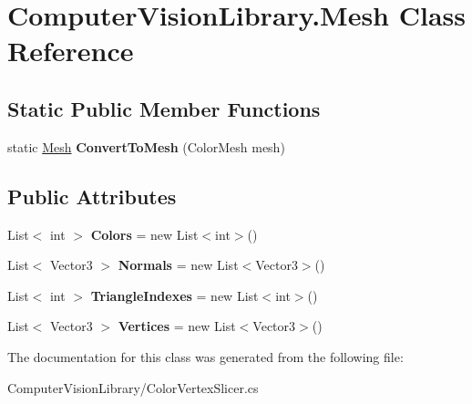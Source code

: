 \hypertarget{class_computer_vision_library_1_1_mesh}{}\section{Computer\+Vision\+Library.\+Mesh Class Reference}
\label{class_computer_vision_library_1_1_mesh}
\subsection*{Static Public Member Functions}
\begin{DoxyCompactItemize}
\item 
\hypertarget{class_computer_vision_library_1_1_mesh_a474e2a8323ace21bf9e9b1a318ec2933}{}\label{class_computer_vision_library_1_1_mesh_a474e2a8323ace21bf9e9b1a318ec2933} 
static \hyperlink{class_computer_vision_library_1_1_mesh}{Mesh} {\bfseries Convert\+To\+Mesh} (Color\+Mesh mesh)
\end{DoxyCompactItemize}
\subsection*{Public Attributes}
\begin{DoxyCompactItemize}
\item 
\hypertarget{class_computer_vision_library_1_1_mesh_a87b64387853c5763cc36162bd240b605}{}\label{class_computer_vision_library_1_1_mesh_a87b64387853c5763cc36162bd240b605} 
List$<$ int $>$ {\bfseries Colors} = new List$<$int$>$()
\item 
\hypertarget{class_computer_vision_library_1_1_mesh_aaceb8d18da9c619358990006cd26463c}{}\label{class_computer_vision_library_1_1_mesh_aaceb8d18da9c619358990006cd26463c} 
List$<$ Vector3 $>$ {\bfseries Normals} = new List$<$Vector3$>$()
\item 
\hypertarget{class_computer_vision_library_1_1_mesh_a8aae428c03c495bef5b794d0906b8d8a}{}\label{class_computer_vision_library_1_1_mesh_a8aae428c03c495bef5b794d0906b8d8a} 
List$<$ int $>$ {\bfseries Triangle\+Indexes} = new List$<$int$>$()
\item 
\hypertarget{class_computer_vision_library_1_1_mesh_a221b5715a75d59ad66df845b95b61825}{}\label{class_computer_vision_library_1_1_mesh_a221b5715a75d59ad66df845b95b61825} 
List$<$ Vector3 $>$ {\bfseries Vertices} = new List$<$Vector3$>$()
\end{DoxyCompactItemize}


The documentation for this class was generated from the following file\+:\begin{DoxyCompactItemize}
\item 
Computer\+Vision\+Library/Color\+Vertex\+Slicer.\+cs\end{DoxyCompactItemize}

